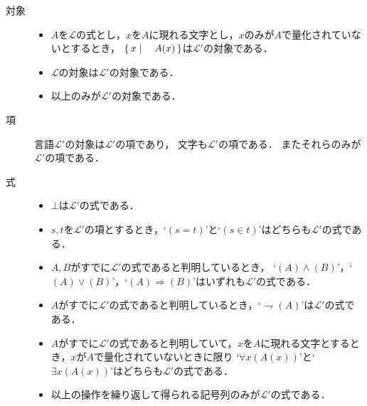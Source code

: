	\begin{description}
		\item[対象]
			\begin{itemize}
				\item $A$を$\mathcal{L}$の式とし，$x$を$A$に現れる文字とし，$x$のみが$A$で量化されていないとするとき，
					$\left\{\, x \mid \quad A(x)\, \right\}$は$\mathcal{L}'$の対象である．
					
				\item $\mathcal{L}$の対象は$\mathcal{L}'$の対象である．
				
				\item 以上のみが$\mathcal{L}'$の対象である．
			\end{itemize}
			
		\item[項] 言語$\mathcal{L}'$の対象は$\mathcal{L}'$の項であり，
			文字も$\mathcal{L}'$の項である．
			またそれらのみが$\mathcal{L}'$の項である．
	
		\item[式] 
			\begin{itemize}
				\item $\bot$は$\mathcal{L}'$の式である．
				
				\item $s,t$を$\mathcal{L}'$の項とするとき，`$(s=t)$'と`$(s \in t)$'はどちらも$\mathcal{L}'$の式である．
					
				\item $A,B$がすでに$\mathcal{L}'$の式であると判明しているとき，
					`$(A) \wedge (B)$'，`$(A) \vee (B)$'，`$(A) \Longrightarrow (B)$'はいずれも$\mathcal{L}'$の式である．
				
				\item $A$がすでに$\mathcal{L}'$の式であると判明しているとき，`$\rightharpoondown (A)$'は$\mathcal{L}'$の式である．
				
				\item $A$がすでに$\mathcal{L}'$の式であると判明していて，$x$を$A$に現れる文字とするとき，$x$が$A$で量化されていないときに限り
					`$\forall x (A(x))$'と`$\exists x (A(x))$'はどちらも$\mathcal{L}'$の式である．
				
				\item 以上の操作を繰り返して得られる記号列のみが$\mathcal{L}'$の式である．
			\end{itemize}
	\end{description}
	
